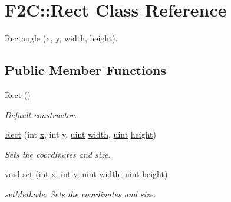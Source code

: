 \hypertarget{class_f2_c_1_1_rect}{
\section{F2C::Rect Class Reference}
\label{class_f2_c_1_1_rect}
}


Rectangle (x, y, width, height).  
\subsection*{Public Member Functions}
\begin{DoxyCompactItemize}
\item 
\hypertarget{class_f2_c_1_1_rect_af570dfeafc6bdbf8bf71de8b013ec900}{
\hyperlink{class_f2_c_1_1_rect_af570dfeafc6bdbf8bf71de8b013ec900}{Rect} ()}
\label{class_f2_c_1_1_rect_af570dfeafc6bdbf8bf71de8b013ec900}

\begin{DoxyCompactList}\small\item\em Default constructor. \item\end{DoxyCompactList}\item 
\hyperlink{class_f2_c_1_1_rect_a8bcb9a48495ea4d148adcef272e67822}{Rect} (int \hyperlink{class_f2_c_1_1_rect_ac7bcfcc62fd039c017237fe58af2c522}{x}, int \hyperlink{class_f2_c_1_1_rect_a6544ff924f6cbac45818f791c211f263}{y}, \hyperlink{namespace_f2_c_a58be2bac9eb3e3c99cb41b6008bf4fae}{uint} \hyperlink{class_f2_c_1_1_rect_af3b89af9b207a83a41b1d627ebf05b6e}{width}, \hyperlink{namespace_f2_c_a58be2bac9eb3e3c99cb41b6008bf4fae}{uint} \hyperlink{class_f2_c_1_1_rect_a8b7a0f3c1156c169ca5f47b0bc739197}{height})
\begin{DoxyCompactList}\small\item\em Sets the coordinates and size. \item\end{DoxyCompactList}\item 
void \hyperlink{class_f2_c_1_1_rect_ad7bf1745dbafc37295e53cd0f72e12f2}{set} (int \hyperlink{class_f2_c_1_1_rect_ac7bcfcc62fd039c017237fe58af2c522}{x}, int \hyperlink{class_f2_c_1_1_rect_a6544ff924f6cbac45818f791c211f263}{y}, \hyperlink{namespace_f2_c_a58be2bac9eb3e3c99cb41b6008bf4fae}{uint} \hyperlink{class_f2_c_1_1_rect_af3b89af9b207a83a41b1d627ebf05b6e}{width}, \hyperlink{namespace_f2_c_a58be2bac9eb3e3c99cb41b6008bf4fae}{uint} \hyperlink{class_f2_c_1_1_rect_a8b7a0f3c1156c169ca5f47b0bc739197}{height})
\begin{DoxyCompactList}\small\item\em setMethode: Sets the coordinates and size. \item\end{DoxyCompactList}\end{DoxyCompactItemize}

